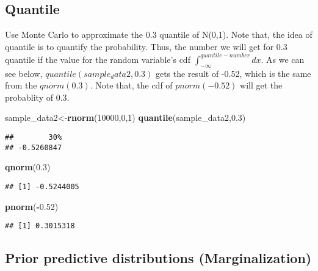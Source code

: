 \documentclass[
]{book}
\newenvironment{Shaded}{\begin{snugshade}}{\end{snugshade}}
\newcommand{\DecValTok}[1]{\textcolor[rgb]{0.00,0.00,0.81}{#1}}
\newcommand{\FloatTok}[1]{\textcolor[rgb]{0.00,0.00,0.81}{#1}}
\newcommand{\KeywordTok}[1]{\textcolor[rgb]{0.13,0.29,0.53}{\textbf{#1}}}
\newcommand{\NormalTok}[1]{#1}
\newcommand{\OperatorTok}[1]{\textcolor[rgb]{0.81,0.36,0.00}{\textbf{#1}}}
\begin{document}
\hypertarget{quantile}{%
\subsection{Quantile}\label{quantile}}

Use Monte Carlo to approximate the 0.3 quantile of N(0,1). Note that, the idea of quantile is to quantify the probability. Thus, the number we will get for 0.3 quantile if the value for the random variable's cdf \(\int_{-\infty}^{quantile-number}dx\). As we can see below, \(quantile(sample_data2,0.3)\) gets the result of -0.52, which is the same from the \(qnorm(0.3)\). Note that, the cdf of \(pnorm(-0.52)\) will get the probablity of \(0.3\).

\begin{Shaded}
\begin{Highlighting}[]
\NormalTok{sample_data2<-}\KeywordTok{rnorm}\NormalTok{(}\DecValTok{10000}\NormalTok{,}\DecValTok{0}\NormalTok{,}\DecValTok{1}\NormalTok{)}
\KeywordTok{quantile}\NormalTok{(sample_data2,}\FloatTok{0.3}\NormalTok{)}
\end{Highlighting}
\end{Shaded}

\begin{verbatim}
##        30% 
## -0.5260847
\end{verbatim}

\begin{Shaded}
\begin{Highlighting}[]
\KeywordTok{qnorm}\NormalTok{(}\FloatTok{0.3}\NormalTok{)}
\end{Highlighting}
\end{Shaded}

\begin{verbatim}
## [1] -0.5244005
\end{verbatim}

\begin{Shaded}
\begin{Highlighting}[]
\KeywordTok{pnorm}\NormalTok{(}\OperatorTok{-}\FloatTok{0.52}\NormalTok{)}
\end{Highlighting}
\end{Shaded}

\begin{verbatim}
## [1] 0.3015318
\end{verbatim}

\hypertarget{prior-predictive-distributions-marginalization}{%
\subsection{Prior predictive distributions (Marginalization)}\label{prior-predictive-distributions-marginalization}}
\end{document}
